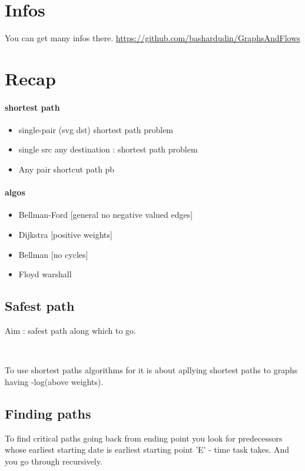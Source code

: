 \documentclass[a4paper,11pt]{article}
\title{}
\author{Bashar DUDIN}
\date{}
\begin{document}
\maketitle
\tableofcontents
\newpage
\section{Infos}
You can get many infos there.
\url{https://github.com/bashardudin/GraphsAndFlows}

\section{Recap}
\paragraph{shortest path}
\begin{itemize}
  \item single-pair (svg dst) shortest path problem
  \item single src any destination : shortest path problem
  \item Any pair shortcut path pb
\end{itemize}

\paragraph{algos}
\begin{itemize}
  \item Bellman-Ford [general no negative valued edges]
  \item Dijkstra [positive weights]
  \item Bellman  [no cycles]
  \item Floyd warshall 
\end{itemize}



\subsection{Safest path}
Aim : safest path along which to go.

\

To use shortest paths algorithms for it  is about apllying shortest paths to graphs having  -log(above weights).

\subsection{Finding paths}
To find critical paths going back from ending point you look for predecessors whose earliest starting date  is earliest starting point 'E' - time task takes. And you go through recursively.
\end{document}
